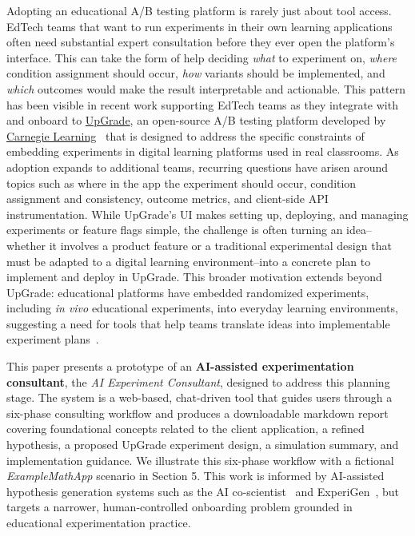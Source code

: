 \documentclass[manuscript,screen]{acmart}
\begin{document}
Adopting an educational A/B testing platform is rarely just about tool access. EdTech teams that want to run experiments in their own learning applications often need substantial expert consultation before they ever open the platform's interface. This can take the form of help deciding \emph{what} to experiment on, \emph{where} condition assignment should occur, \emph{how} variants should be implemented, and \emph{which} outcomes would make the result interpretable and actionable. This pattern has been visible in recent work supporting EdTech teams as they integrate with and onboard to \href{https://www.upgradeplatform.org/}{UpGrade}, an open-source A/B testing platform developed by \href{https://carnegielearning.com/}{Carnegie Learning}~\cite{upgrade} that is designed to address the specific constraints of embedding experiments in digital learning platforms used in real classrooms. As adoption expands to additional teams, recurring questions have arisen around topics such as where in the app the experiment should occur, condition assignment and consistency, outcome metrics, and client-side API instrumentation. While UpGrade's UI makes setting up, deploying, and managing experiments or feature flags simple, the challenge is often turning an idea--whether it involves a product feature or a traditional experimental design that must be adapted to a digital learning environment--into a concrete plan to implement and deploy in UpGrade. This broader motivation extends beyond UpGrade: educational platforms have embedded randomized experiments, including \emph{in vivo} educational experiments, into everyday learning environments, suggesting a need for tools that help teams translate ideas into implementable experiment plans~\cite{williams2015inVivoEducationalExperiments}. 

This paper presents a prototype of an \textbf{AI-assisted experimentation consultant}, the \emph{AI Experiment Consultant}, designed to address this planning stage. The system is a web-based, chat-driven tool that guides users through a six-phase consulting workflow and produces a downloadable markdown report covering foundational concepts related to the client application, a refined hypothesis, a proposed UpGrade experiment design, a simulation summary, and implementation guidance. We illustrate this six-phase workflow with a fictional \emph{ExampleMathApp} scenario in Section 5. This work is informed by AI-assisted hypothesis generation systems such as the AI co-scientist~\cite{ai-coscientist} and ExperiGen~\cite{experigen}, but targets a narrower, human-controlled onboarding problem grounded in educational experimentation practice.
\end{document}
